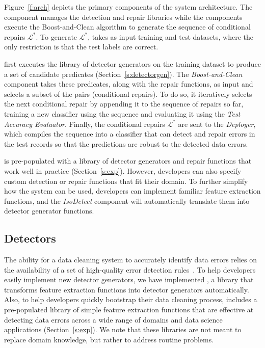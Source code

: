 
Figure~\ref{f:arch} depicts the primary components of the system architecture. The  component manages the detection and repair libraries while the  components execute the Boost-and-Clean algorithm to generate the sequence of conditional repairs $\mathcal{L}^*$.  To generate $\mathcal{L}^*$, \sys takes as input training and test datasets, where the only restriction is that the test labels are correct. 

\sys first executes the library of detector generators on the training dataset to produce a set of candidate predicates (Section~\ref{s:detectorgen}).    The {\it Boost-and-Clean} component takes these predicates, along with the repair functions, as input and selects a subset of the pairs (conditional repairs).  To do so, it iteratively selects the next conditional repair by appending it to the sequence of repairs so far, training a new classifier using the sequence and evaluating it using the {\it Test Accuracy Evaluator}.  Finally, the conditional repairs $\mathcal{L}^*$ are sent to the {\it Deployer}, which compiles the sequence into a  classifier that can detect and repair errors in the test records so that the predictions are robust to the detected data errors.  

\sys is pre-populated with a library of detector generators and repair functions that work well in practice (Section~\ref{s:exp}).  However,  developers can also specify custom detection or repair functions that fit their domain.  To further simplify how the system can be used, developers can implement familiar feature extraction functions, and the {\it IsoDetect} component will automatically translate them into detector generator functions.

\subsection{Detectors}
The ability for a data cleaning system to accurately identify data errors relies on the availability of a set of high-quality error detection rules~\cite{DBLP:conf/sigmod/ChuIKW16}.  To help developers easily implement new detector generators, we have implemented \detectlib, a library that transforms feature extraction functions into detector generators automatically.  Also, to help developers quickly bootstrap their data cleaning process, \sys includes a pre-populated library of simple feature extraction functions that are effective at detecting data errors across a wide range of domains and data science applications (Section~\ref{s:exp}).  We note that these libraries are not meant to replace domain knowledge, but rather to address routine problems.

